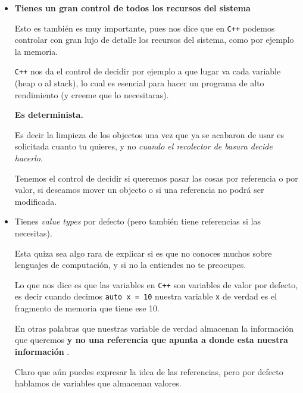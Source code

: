 \documentclass[12pt, fleqn]{report}                             %
\theoremstyle{break}                                            %
\newcommand{\textCode}[1]  { \texttt{#1} }                      %
\newcommand \Cpp  {\textCode{C++} }                               %
\begin{document}
\begin{itemize}
                \clearpage

                \item \textbf{Tienes un gran control de todos los recursos del sistema}
                
                    Esto es también es muy importante, pues nos dice que en \Cpp podemos controlar con gran lujo de detalle
                    los recursos del sistema, como por ejemplo la memoria.

                    \Cpp nos da el control de decidir por ejemplo a que lugar va cada variable (heap o al stack), 
                    lo cual es esencial para hacer un programa de alto rendimiento (y creeme que lo necesitaras).

                    \textbf{Es determinista.}

                    Es decir la limpieza de los objectos una vez que ya se acabaron de usar es solicitada cuanto tu quieres,
                    y no \textit{cuando el recolector de basura decide hacerlo}.

                    Tenemos el control de decidir si queremos pasar las cosas por referencia o por valor, si deseamos mover
                    un objecto o si una referencia no podrá ser modificada.

                \item {Tienes \textit{value types} por defecto (pero también tiene referencias si las necesitas)}.
                
                    Esta quiza sea algo rara de explicar si es que no conoces muchos sobre lenguajes de computación, y si
                    no la entiendes no te preocupes. 

                    Lo que nos dice es que las variables en \Cpp son variables de valor por defecto, es decir
                    cuando decimos \textCode{auto x = 10} nuestra variable \textCode{x} de verdad es el fragmento
                    de memoria que tiene ese 10.
                    
                    En otras palabras que nuestras variable de verdad almacenan la información que queremos \textbf{
                        y no una referencia que apunta a donde esta nuestra información
                    }.

                    Claro que aún puedes expresar la idea de las referencias, pero por defecto hablamos de variables que almacenan valores.
            \end{itemize}
\end{document}
